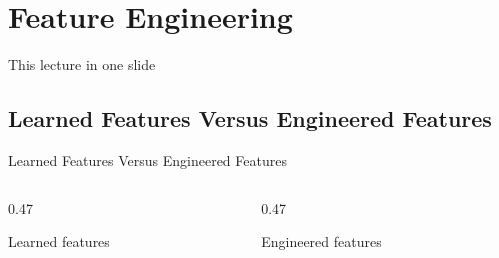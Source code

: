 
\section[Feature Engineering]{Feature Engineering}


\begin{frame}{This lecture in one slide}
  \begin{withmargin}
    \begin{tdmain}
    \end{tdmain}
    \begin{tdmargin}
    \end{tdmargin}
  \end{withmargin}
\end{frame}

\subsection{Learned Features Versus Engineered Features}

\begin{frame}{Learned Features Versus Engineered Features}
  \begin{columns}[T,onlytextwidth]
    \begin{column}{0.47\textwidth}
      \begin{tdblockt}[equal height group=lfef]{Learned features}
      \end{tdblockt}
    \end{column}
    \begin{column}{0.47\textwidth}
      \begin{tdblockt}[equal height group=lfef]{Engineered features}
      \end{tdblockt}
    \end{column}
  \end{columns}
\end{frame}

